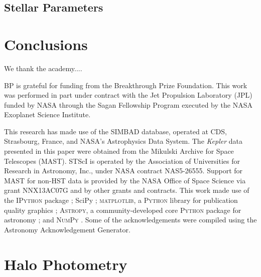 \documentclass[modern]{aastex61}
\newcommand{\kepler}{\emph{Kepler}\xspace}
\begin{document}
\subsection{Stellar Parameters}

\section{Conclusions}

\acknowledgments

We thank the academy....

BP is grateful for funding from the Breakthrough Prize Foundation. This work was performed in part under contract with the Jet Propulsion Laboratory (JPL) funded by NASA through the Sagan Fellowship Program executed by the NASA Exoplanet Science Institute.

This research has made use of the SIMBAD database, operated at CDS, Strasbourg, France, and NASA's Astrophysics Data System. The \kepler data presented in this paper were obtained from the Mikulski Archive for Space Telescopes (MAST). STScI is operated by the Association of Universities for Research in Astronomy, Inc., under NASA contract NAS5-26555. Support for MAST for non-HST data is provided by the NASA Office of Space Science via grant NNX13AC07G and by other grants and contracts.  This work made use of the \textsc{IPython} package \citep{PER-GRA:2007}; SciPy \citep{scipy};  \textsc{matplotlib}, a \textsc{Python} library for publication quality graphics \citep{Hunter:2007}; \textsc{Astropy}, a community-developed core \textsc{Python} package for astronomy \citep{2013A&A...558A..33A}; and \textsc{NumPy} \citep{van2011numpy}. Some of the acknowledgements were compiled using the Astronomy Acknowledgement Generator.

\appendix

\section{Halo Photometry}
\label{halo}
\end{document}
